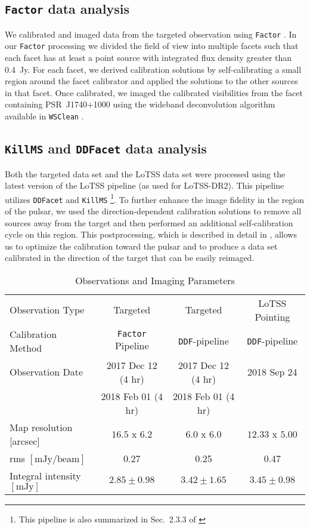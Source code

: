 \documentclass[manuscript]{aastex63}
\begin{document}
\subsection{\texttt{Factor} data analysis}\label{subsec:calib1}

We calibrated and imaged data from the targeted observation using \texttt{Factor} \citep{2016vanWeeren,2016Williams}. In our \texttt{Factor} processing we divided the field of view into multiple facets such that each facet has at least a point source with integrated flux density greater than 0.4~Jy. For each facet, we derived calibration solutions by self-calibrating a small region around the facet calibrator and applied the solutions to the other sources in that facet. Once calibrated, we imaged the calibrated visibilities from the facet containing PSR~J1740+1000 using the wideband deconvolution algorithm available in \texttt{WSClean} \citep{offringa2014}.

\subsection{\texttt{KillMS} and \texttt{DDFacet} data analysis}\label{subsec:calib2}

Both the targeted data set and the LoTSS data set were processed using the latest version of the LoTSS pipeline (as used for LoTSS-DR2). This pipeline utilizes \texttt{DDFacet} \citep{2018Tasse} and \texttt{KillMS} \citep{2014Tasse,2015Smirnov,2020Tasse}\footnote{This pipeline is also summarized in Sec.~2.3.3 of \citet{2019Shimwell}}. To further enhance the image fidelity in the region of the pulsar, we used the direction-dependent calibration solutions to remove all sources away from the target and then performed an additional self-calibration cycle on this region. This postprocessing, which is described in detail in \citet{2020vanWeeren}, allows us to optimize the calibration toward the pulsar and to produce a data set calibrated in the direction of the target that can be easily reimaged. 

\begin{table}
	\centering
	\caption{Observations and Imaging Parameters}
	\label{tab:general}
	\begin{tabular}{lccc} %
		\hline
		Observation Type &  Targeted  & Targeted  & LoTSS Pointing\\
		Calibration Method & \texttt{Factor} Pipeline &  \texttt{DDF}-pipeline & \texttt{DDF}-pipeline\\
		\hline
		Observation Date & 2017 Dec 12 (4 hr) & 2017 Dec 12 (4 hr) &  2018 Sep 24 \\
		                 &  2018 Feb 01 (4 hr) & 2018 Feb 01 (4 hr)& \\
		Map resolution [arcsec] & $16.5$ x $6.2$ & $6.0$ x $6.0$ & $12.33$ x $5.00$\\
		         rms $[\mathrm{mJy}/\mathrm{beam}]$ & 0.27 & 0.25 & 0.47 \\
        Integral intensity $[\mathrm{mJy}]$ &  $2.85 \pm 0.98$  &  $3.42 \pm 1.65$  &  $3.45 \pm 0.98$ \\

		\hline
	\end{tabular}
\end{table}
\end{document}
